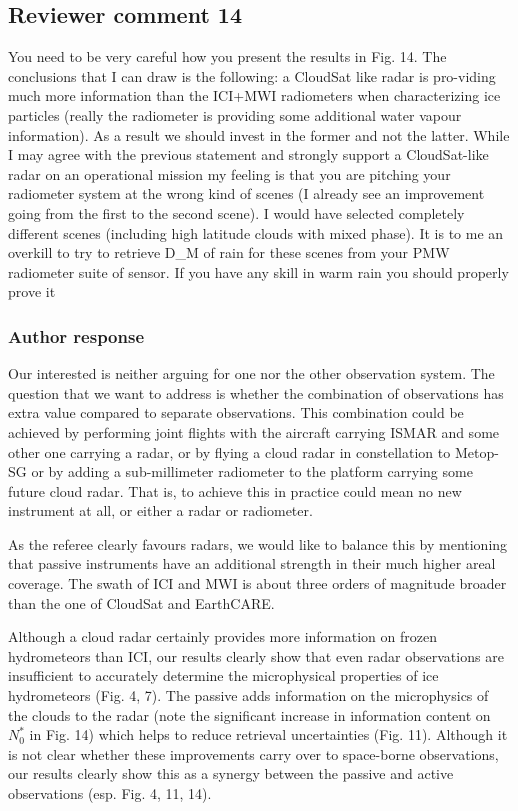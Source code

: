 \documentclass[11pt]{scrartcl}
\begin{document}
\subsection*{Reviewer comment 14}
You need to be very careful how you present the results in Fig. 14. The
conclusions that I can draw is the following: a CloudSat like radar is
pro-viding much more information than the ICI+MWI radiometers when
characterizing ice particles (really the radiometer is providing some additional
water vapour information). As a result we should invest in the former and not the
latter. While I may agree with the previous statement and strongly support a
CloudSat-like radar on an operational mission my feeling is that you are
pitching your radiometer system at the wrong kind of scenes (I already see an
improvement going from the first to the second scene). I would have selected
completely different scenes (including high latitude clouds with mixed phase). It
is to me an overkill to try to retrieve D\_M of rain for these scenes from your
PMW radiometer suite of sensor. If you have any skill in warm rain you
should properly prove it

\subsubsection*{Author response}

Our interested is neither arguing for one nor the other observation system. The
question that we want to address is whether the combination of observations has
extra value compared to separate observations. This combination could be achieved
by performing joint flights with the aircraft carrying ISMAR and some other one
carrying a radar, or by flying a cloud radar in constellation to Metop-SG or by
adding a sub-millimeter radiometer to the platform carrying some future cloud
radar. That is, to achieve this in practice could mean no new instrument at all,
or either a radar or radiometer.

As the referee clearly favours radars, we would like to balance this by mentioning that
passive instruments have an additional strength in their much higher areal coverage. The
swath of ICI and MWI is about three orders of magnitude broader than the one of CloudSat
and EarthCARE.

Although a cloud radar certainly provides more information on frozen
hydrometeors than ICI, our results clearly show that even radar observations are
insufficient to accurately determine the microphysical properties of ice
hydrometeors (Fig. 4, 7). The passive adds information on the microphysics of
the clouds to the radar (note the significant increase in information content on
$N_0^*$ in Fig. 14) which helps to reduce retrieval uncertainties (Fig. 11).
Although it is not clear whether these improvements carry over to space-borne
observations, our results clearly show this as a synergy between the passive and
active observations (esp. Fig. 4, 11, 14).
\end{document}
